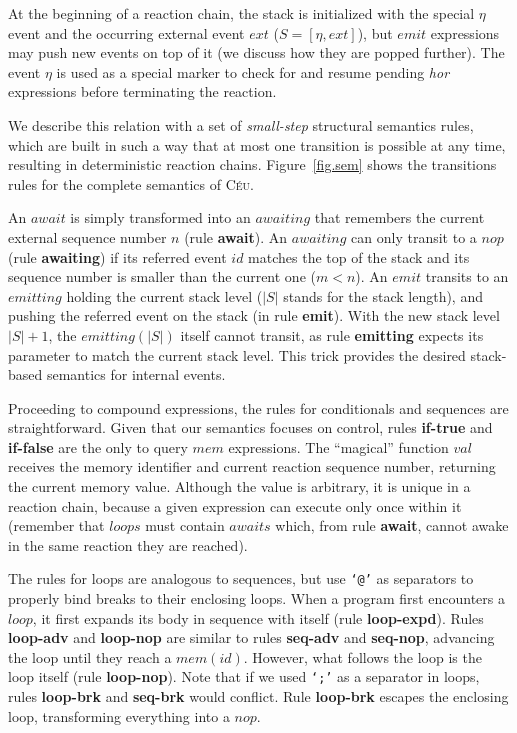 \documentclass{acm_proc_article-sp}
\newcommand{\CEU}{\textsc{C\'{e}u}\xspace}
\newcommand{\code}[1] {{\small{\texttt{#1}}}}
\newcommand{\rr}[1] {{\textbf{\scriptsize{#1}}}}
\newcommand{\1}{\;}
\newcommand{\2}{\;\;}
\newcommand{\3}{\;\;\;}
\newcommand{\5}{\;\;\;\;\;}
\begin{document}
At the beginning of a reaction chain, the stack is initialized with the special 
$\eta$ event and the occurring external event $ext$ ($S=[\eta,ext]$), but 
$emit$ expressions may push new events on top of it (we discuss how they are 
popped further).
%
The event $\eta$ is used as a special marker to check for and resume pending 
\emph{hor} expressions before terminating the reaction.

We describe this relation with a set of \emph{small-step} structural semantics 
rules, which are built in such a way that at most one transition is possible at 
any time, resulting in deterministic reaction chains.
%
Figure~\ref{fig.sem} shows the transitions rules for the complete semantics of 
\CEU.

An $await$ is simply transformed into an $awaiting$ that remembers the current 
external sequence number $n$ (rule \rr{await}).
An $awaiting$ can only transit to a $nop$ (rule \rr{awaiting}) if its referred 
event $id$ matches the top of the stack and its sequence number is smaller than 
the current one ($m<n$).
%
%
An $emit$ transits to an $emitting$ holding the current stack level ($|S|$ 
stands for the stack length), and pushing the referred event on the stack (in 
rule \rr{emit}).
With the new stack level $|S|+1$, the $emitting(|S|)$ itself cannot transit, as 
rule \rr{emitting} expects its parameter to match the current stack level.
This trick provides the desired stack-based semantics for internal events.

Proceeding to compound expressions, the rules for conditionals and sequences 
are straightforward.
%
Given that our semantics focuses on control, rules \rr{if-true} and 
\rr{if-false} are the only to query $mem$ expressions.
%
The ``magical'' function $val$ receives the memory identifier and current 
reaction sequence number, returning the current memory value.
%
Although the value is arbitrary, it is unique in a reaction chain, because a 
given expression can execute only once within it (remember that $loops$ must 
contain $awaits$ which, from rule \rr{await}, cannot awake in the same reaction 
they are reached).

The rules for loops are analogous to sequences, but use \code{`@'} as 
separators to properly bind breaks to their enclosing loops.
%
When a program first encounters a $loop$, it first expands its body in sequence 
with itself (rule \rr{loop-expd}).
Rules \rr{loop-adv} and \rr{loop-nop} are similar to rules \rr{seq-adv} and 
\rr{seq-nop}, advancing the loop until they reach a $mem(id)$.
However, what follows the loop is the loop itself (rule \rr{loop-nop}).
Note that if we used \code{`;'} as a separator in loops, rules \rr{loop-brk} 
and \rr{seq-brk} would conflict.
%
Rule \rr{loop-brk} escapes the enclosing loop, transforming everything into a 
$nop$.
\end{document}
